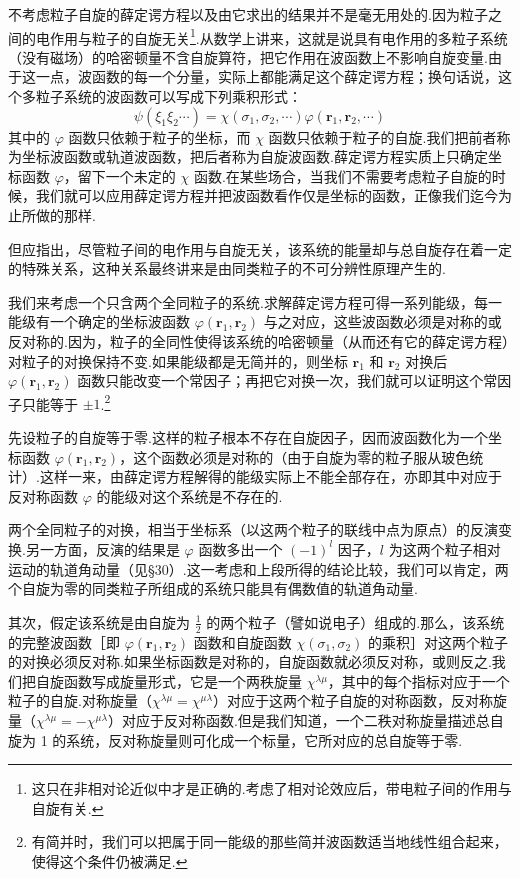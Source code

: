 不考虑粒子自旋的薛定谔方程以及由它求出的结果并不是毫无用处的.因为粒子之间的电作用与粒子的自旋无关\footnote{这只在非相对论近似中才是正确的.考虑了相对论效应后，带电粒子间的作用与自旋有关.}.从数学上讲来，这就是说具有电作用的多粒子系统（没有磁场）的哈密顿量不含自旋算符，把它作用在波函数上不影响自旋变量.由于这一点，波函数的每一个分量，实际上都能满足这个薛定谔方程；换句话说，这个多粒子系统的波函数可以写成下列乘积形式：
\begin{equation*}
  \psi(\xi_1\xi_2\cdots)=\chi(\sigma_1,\sigma_2,\cdots)\varphi(\boldsymbol{r}_1,\boldsymbol{r}_2,\cdots)
\end{equation*}
其中的 $\varphi$ 函数只依赖于粒子的坐标，而 $\chi$ 函数只依赖于粒子的自旋.我们把前者称为坐标波函数或轨道波函数，把后者称为自旋波函数.薛定谔方程实质上只确定坐标函数 $\varphi$，留下一个未定的 $\chi$ 函数.在某些场合，当我们不需要考虑粒子自旋的时候，我们就可以应用薛定谔方程并把波函数看作仅是坐标的函数，正像我们迄今为止所做的那样.

但应指出，尽管粒子间的电作用与自旋无关，该系统的能量却与总自旋存在着一定的特殊关系，这种关系最终讲来是由同类粒子的不可分辨性原理产生的.

我们来考虑一个只含两个全同粒子的系统.求解薛定谔方程可得一系列能级，每一能级有一个确定的坐标波函数 $\varphi(\boldsymbol{r}_1,\boldsymbol{r}_2)$ 与之对应，这些波函数必须是对称的或反对称的.因为，粒子的全同性使得该系统的哈密顿量（从而还有它的薛定谔方程）对粒子的对换保持不变.如果能级都是无简并的，则坐标 $\boldsymbol{r}_1$ 和 $\boldsymbol{r}_2$ 对换后 $\varphi(\boldsymbol{r}_1,\boldsymbol{r}_2)$ 函数只能改变一个常因子；再把它对换一次，我们就可以证明这个常因子只能等于 $\pm 1$.\footnote{有简并时，我们可以把属于同一能级的那些简并波函数适当地线性组合起来，使得这个条件仍被满足.}

先设粒子的自旋等于零.这样的粒子根本不存在自旋因子，因而波函数化为一个坐标函数 $\varphi(\boldsymbol{r}_1,\boldsymbol{r}_2)$，这个函数必须是对称的（由于自旋为零的粒子服从玻色统计）.这样一来，由薛定谔方程解得的能级实际上不能全部存在，亦即其中对应于反对称函数 $\varphi$ 的能级对这个系统是不存在的.

两个全同粒子的对换，相当于坐标系（以这两个粒子的联线中点为原点）的反演变换.另一方面，反演的结果是 $\varphi$ 函数多出一个 $(-1)^l$ 因子，$l$ 为这两个粒子相对运动的轨道角动量（见§30）.这一考虑和上段所得的结论比较，我们可以肯定，两个自旋为零的同类粒子所组成的系统只能具有偶数值的轨道角动量.

其次，假定该系统是由自旋为 $\frac{1}{2}$ 的两个粒子（譬如说电子）组成的.那么，该系统的完整波函数［即 $\varphi(\boldsymbol{r}_1,\boldsymbol{r}_2)$ 函数和自旋函数 $\chi(\sigma_1,\sigma_2)$ 的乘积］对这两个粒子的对换必须反对称.如果坐标函数是对称的，自旋函数就必须反对称，或则反之.我们把自旋函数写成旋量形式，它是一个两秩旋量 $\chi^{\lambda\mu}$，其中的每个指标对应于一个粒子的自旋.对称旋量（$\chi^{\lambda\mu}=\chi^{\mu\lambda}$）对应于这两个粒子自旋的对称函数，反对称旋量（$\chi^{\lambda\mu}=-\chi^{\mu\lambda}$）对应于反对称函数.但是我们知道，一个二秩对称旋量描述总自旋为 1 的系统，反对称旋量则可化成一个标量，它所对应的总自旋等于零.

